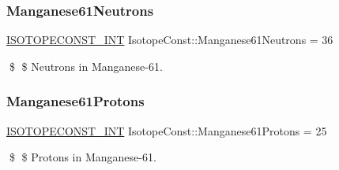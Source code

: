 \subsubsection{\texorpdfstring{Manganese61\+Neutrons}{Manganese61Neutrons}}
{\footnotesize\ttfamily \mbox{\hyperlink{group___isotope_const-_macros_ga5f18360b3e99483a35c32d789e62621c}{I\+S\+O\+T\+O\+P\+E\+C\+O\+N\+S\+T\+\_\+\+I\+NT}} Isotope\+Const\+::\+Manganese61\+Neutrons = 36}

\$ \$ Neutrons in Manganese-\/61. \mbox{\label{group___isotope_const-_manganese-_mn61_gae4e436aa88552e28131ede68f1962e8a}} 
\subsubsection{\texorpdfstring{Manganese61\+Protons}{Manganese61Protons}}
{\footnotesize\ttfamily \mbox{\hyperlink{group___isotope_const-_macros_ga5f18360b3e99483a35c32d789e62621c}{I\+S\+O\+T\+O\+P\+E\+C\+O\+N\+S\+T\+\_\+\+I\+NT}} Isotope\+Const\+::\+Manganese61\+Protons = 25}

\$ \$ Protons in Manganese-\/61. 